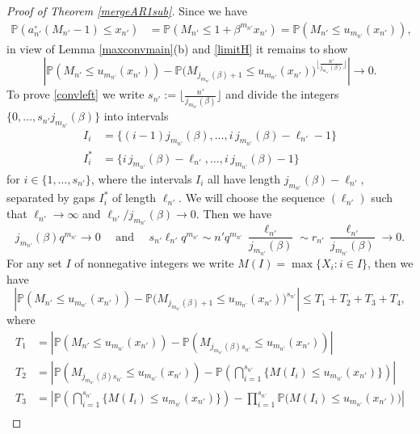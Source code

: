 \documentclass[12pt]{amsart}
\theoremstyle{definition}
\theoremstyle{remark}
\newcommand{\Pm}{{\mathbb P}}
\numberwithin{equation}{section}
\begin{document}
\begin{proof}[Proof of Theorem \ref{mergeAR1sub}]
Since we have
\begin{align*}
\Pm(a_{n'}^{\circ}(M_{n'}-1)\leq x_{n'}) & 
=\Pm(M_{n'}\leq 1+\beta^{m_{n'}}x_{n'})=\Pm(M_{n'}\leq u_{m_{n'}}(x_{n'})),
\end{align*}
in view of Lemma \ref{maxconvmain}(b) and \eqref{limitH} it remains to show
\begin{equation}\label{convleft}
\left|\Pm(M_{n'}\leq u_{m_{n'}}(x_{n'}))-\Pm\big(M_{j_{m_{n'}}(\beta)+1}\leq u_{m_{n'}}(x_{n'})\big)^{\lfloor\frac{n'}{j_{m_{n'}}(\beta)}\rfloor}\right|\to0.
\end{equation}
To prove \eqref{convleft} we write $s_{n'}:=\lfloor\frac{n'}{j_{m_{n'}}(\beta)}\rfloor$ and divide the integers $\{0,\ldots,s_{n'}j_{m_{n'}}(\beta)\}$ into intervals
\begin{align*}
I_{i} & =\{(i-1)j_{m_{n'}}(\beta),\ldots,i\,j_{m_{n'}}(\beta)-\ell_{n'}-1\}\\
I_{i}^{\ast} & =\{i\,j_{m_{n'}}(\beta)-\ell_{n'},\ldots,i\,j_{m_{n'}}(\beta)-1\}
\end{align*}
for $i\in\{1,\ldots,s_{n'}\}$, where the intervals $I_{i}$ all have length $j_{m_{n'}}(\beta)-\ell_{n'}$, separated by gaps $I_{i}^{\ast}$ of length $\ell_{n'}$. We will choose the sequence $(\ell_{n'})$ such that $\ell_{n'}\to\infty$ and $\ell_{n'}/j_{m_{n'}}(\beta)\to0$. Then we have
\begin{equation}\label{ellasymp}
j_{m_{n'}}(\beta)q^{m_{n'}}\to0\quad\text{ and }\quad s_{n'}\ell_{n'}q^{m_{n'}}\sim n'q^{m_{n'}}\,\frac{\ell_{n'}}{j_{m_{n'}}(\beta)}\sim r_{n'}\,\frac{\ell_{n'}}{j_{m_{n'}}(\beta)}\to0.
\end{equation}
For any set $I$ of nonnegative integers we write $M(I)=\max\{X_{i}: i\in I\}$, then we have
$$\left|\Pm(M_{n'}\leq u_{m_{n'}}(x_{n'}))-\Pm\big(M_{j_{m_{n'}}(\beta)+1}\leq u_{m_{n'}}(x_{n'})\big)^{s_{n'}}\right|\leq T_{1}+T_{2}+T_{3}+T_{4},$$
where
\begin{align*}
T_{1} & =\left|\Pm(M_{n'}\leq u_{m_{n'}}(x_{n'}))-\Pm(M_{j_{m_{n'}}(\beta)s_{n'}}\leq u_{m_{n'}}(x_{n'}))\right|\\
T_{2} & =\left|\Pm(M_{j_{m_{n'}}(\beta)s_{n'}}\leq u_{m_{n'}}(x_{n'}))-\Pm\left(\bigcap_{i=1}^{s_{n'}}\{M(I_{i})\leq u_{m_{n'}}(x_{n'})\}\right)\right|\\
T_{3} & =\left|\Pm\left(\bigcap_{i=1}^{s_{n'}}\{M(I_{i})\leq u_{m_{n'}}(x_{n'})\}\right)-\prod_{i=1}^{s_{n'}}\Pm\big(M(I_{i})\leq u_{m_{n'}}(x_{n'})\big)\right|\\

\end{align*}
\end{proof}
\end{document}
